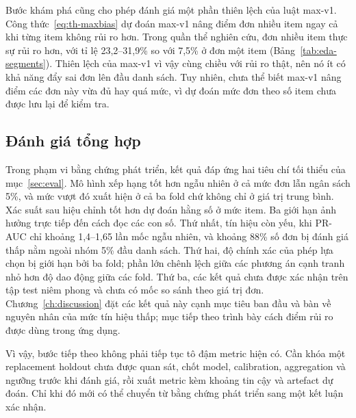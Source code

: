 \documentclass[12pt,a4paper]{report}
\begin{document}
Bước khám phá cũng cho phép đánh giá một phần thiên lệch của luật max-v1. Công thức~\eqref{eq:th-maxbias} dự đoán max-v1 nâng điểm đơn nhiều item ngay cả khi từng item không rủi ro hơn. Trong quần thể nghiên cứu, đơn nhiều item thực sự rủi ro hơn, với tỉ lệ 23,2--31,9\% so với 7,5\% ở đơn một item (Bảng~\ref{tab:eda-segments}). Thiên lệch của max-v1 vì vậy cùng chiều với rủi ro thật, nên nó ít có khả năng đẩy sai đơn lên đầu danh sách. Tuy nhiên, chưa thể biết max-v1 nâng điểm các đơn này vừa đủ hay quá mức, vì dự đoán mức đơn theo số item chưa được lưu lại để kiểm tra.

\subsection{Đánh giá tổng hợp}\label{sec:analysis-summary}

Trong phạm vi bằng chứng phát triển, kết quả đáp ứng hai tiêu chí tối thiểu của mục~\ref{sec:eval}. Mô hình xếp hạng tốt hơn ngẫu nhiên ở cả mức đơn lẫn ngân sách 5\%, và mức vượt đó xuất hiện ở cả ba fold chứ không chỉ ở giá trị trung bình. Xác suất sau hiệu chỉnh tốt hơn dự đoán hằng số ở mức item. Ba giới hạn ảnh hưởng trực tiếp đến cách đọc các con số. Thứ nhất, tín hiệu còn yếu, khi PR-AUC chỉ khoảng 1,4--1,65 lần mốc ngẫu nhiên, và khoảng 88\% số đơn bị đánh giá thấp nằm ngoài nhóm 5\% đầu danh sách. Thứ hai, độ chính xác của phép lựa chọn bị giới hạn bởi ba fold; phần lớn chênh lệch giữa các phương án cạnh tranh nhỏ hơn độ dao động giữa các fold. Thứ ba, các kết quả chưa được xác nhận trên tập test niêm phong và chưa có mốc so sánh theo giá trị đơn. Chương~\ref{ch:discussion} đặt các kết quả này cạnh mục tiêu ban đầu và bàn về nguyên nhân của mức tín hiệu thấp; mục tiếp theo trình bày cách điểm rủi ro được dùng trong ứng dụng.

Vì vậy, bước tiếp theo không phải tiếp tục tô đậm metric hiện có. Cần khóa một replacement holdout chưa được quan sát, chốt model, calibration, aggregation và ngưỡng trước khi đánh giá, rồi xuất metric kèm khoảng tin cậy và artefact dự đoán. Chỉ khi đó mới có thể chuyển từ bằng chứng phát triển sang một kết luận xác nhận.
\end{document}

